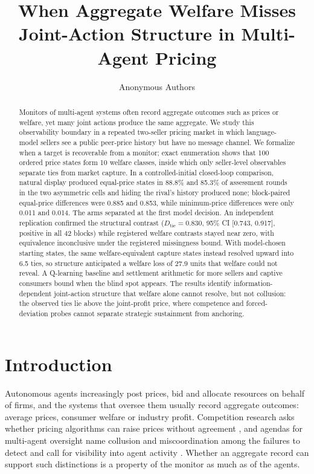 \documentclass[sigconf,review,anonymous]{acmart}
\title{When Aggregate Welfare Misses Joint-Action Structure in Multi-Agent Pricing}
\author{Anonymous Authors}
\begin{document}
\begin{abstract}
Monitors of multi-agent systems often record aggregate outcomes such as prices or welfare, yet many joint actions produce the same aggregate. We study this observability boundary in a repeated two-seller pricing market in which language-model sellers see a public peer-price history but have no message channel. We formalize when a target is recoverable from a monitor; exact enumeration shows that 100 ordered price states form 10 welfare classes, inside which only seller-level observables separate ties from market capture. In a controlled-initial closed-loop comparison, natural display produced equal-price states in 88.8\% and 85.3\% of assessment rounds in the two asymmetric cells and hiding the rival's history produced none; block-paired equal-price differences were 0.885 and 0.853, while minimum-price differences were only 0.011 and 0.014. The arms separated at the first model decision. An independent replication confirmed the structural contrast ($D_{\mathrm{tie}}=0.830$, 95\% CI [0.743, 0.917], positive in all 42 blocks) while registered welfare contrasts stayed near zero, with equivalence inconclusive under the registered missingness bound. With model-chosen starting states, the same welfare-equivalent capture states instead resolved upward into 6.5 ties, so structure anticipated a welfare loss of 27.9 units that welfare could not reveal. A Q-learning baseline and settlement arithmetic for more sellers and captive consumers bound when the blind spot appears. The results identify information-dependent joint-action structure that welfare alone cannot resolve, but not collusion: the observed ties lie above the joint-profit price, where competence and forced-deviation probes cannot separate strategic sustainment from anchoring.
\end{abstract}


\maketitle

\section{Introduction}

Autonomous agents increasingly post prices, bid and allocate resources on behalf of firms, and the systems that oversee them usually record aggregate outcomes: average prices, consumer welfare or industry profit. Competition research asks whether pricing algorithms can raise prices without agreement \cite{ezrachi2017artificial,harrington2018developing,calvano2020ai}, and agendas for multi-agent oversight name collusion and miscoordination among the failures to detect and call for visibility into agent activity \cite{dafoe2021cooperative,hammond2025multiagent,chan2024visibility}. Whether an aggregate record can support such distinctions is a property of the monitor as much as of the agents.
\end{document}
